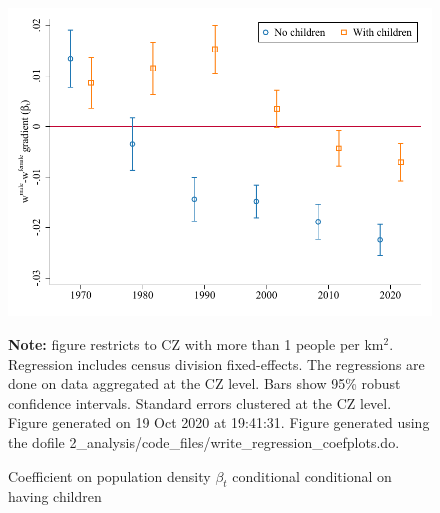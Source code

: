 \begin{figure}[!h]
\centering
\caption{Coefficient on population density $ \beta_t $ conditional conditional on having children}
\includegraphics[width=.6\textwidth]{../2_analysis/output/figures/by_children_l_czone_density_full_time}
\par \begin{minipage}[h]{\textwidth}{\tiny\textbf{Note:} figure restricts to CZ with more than 1 people per km$^2$. Regression includes census division fixed-effects. The regressions are done on data aggregated at the CZ level. Bars show 95\% robust confidence intervals. Standard errors clustered at the CZ level. Figure generated on 19 Oct 2020 at 19:41:31. Figure generated using the dofile 2\_analysis/code\_files/write\_regression\_coefplots.do.}\end{minipage}
\end{figure}
